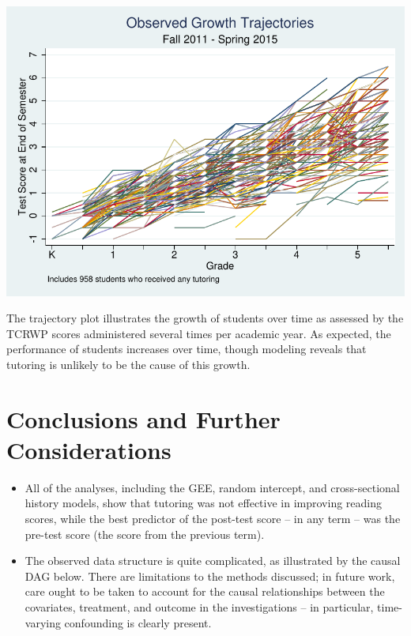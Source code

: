 \documentclass[a0,landscape]{a0poster}
\begin{document}
\begin{multicols}{3}
\color{NavyBlue}

\begin{center}\vspace{1cm}
\includegraphics[width=0.8\linewidth]{xtline.pdf}
\end{center}\vspace{0.5cm}

The trajectory plot illustrates the growth of students over
time as assessed by the TCRWP scores administered several
times per academic year.
As expected, the performance of students increases over time,
though modeling reveals that tutoring is unlikely to be the
cause of this growth.


\color{SaddleBrown} %

\section*{Conclusions and Further Considerations}

\begin{itemize}
\setlength\itemsep{0.5ex}
\item All of the analyses, including the GEE, random intercept,
and cross-sectional history models, show that tutoring
was not effective in improving reading scores,
while the best predictor of the post-test score
-- in any term -- was the pre-test score
(the score from the previous term).
\item The observed data structure is quite complicated,
as illustrated by the causal DAG below.
There are limitations to the methods discussed;
in future work, care ought to be taken to account for the
causal relationships between the covariates, treatment,
and outcome in the investigations -- in particular,
time-varying confounding is clearly present.
\end{itemize}


\end{multicols}
\end{document}
